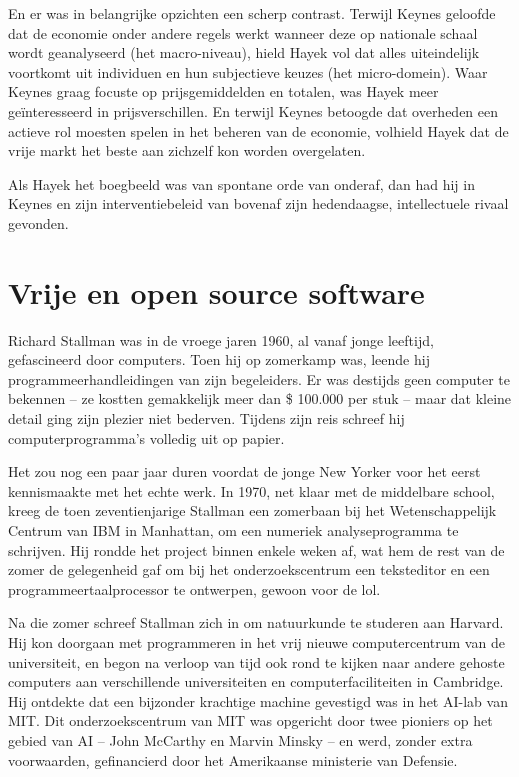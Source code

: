 \documentclass[
  a5paper,
  smalldemyvopaper,11pt,twoside,onecolumn,openright,extrafontsizes,
hidelinks]{memoir}
\begin{document}
En er was in belangrijke opzichten een scherp contrast. Terwijl Keynes
geloofde dat de economie onder andere regels werkt wanneer deze op
nationale schaal wordt geanalyseerd (het macro-niveau), hield Hayek vol
dat alles uiteindelijk voortkomt uit individuen en hun subjectieve
keuzes (het micro-domein). Waar Keynes graag focuste op prijsgemiddelden
en totalen, was Hayek meer geïnteresseerd in prijsverschillen. En
terwijl Keynes betoogde dat overheden een actieve rol moesten spelen in
het beheren van de economie, volhield Hayek dat de vrije markt het beste
aan zichzelf kon worden overgelaten.

Als Hayek het boegbeeld was van spontane orde van onderaf, dan had hij
in Keynes en zijn interventiebeleid van bovenaf zijn hedendaagse,
intellectuele rivaal gevonden.

\chapter{Vrije en open source
software}\label{vrije-en-open-source-software}

Richard Stallman was in de vroege jaren 1960, al vanaf jonge leeftijd,
gefascineerd door computers. Toen hij op zomerkamp was, leende hij
programmeerhandleidingen van zijn begeleiders. Er was destijds geen
computer te bekennen -- ze kostten gemakkelijk meer dan \$ 100.000 per
stuk -- maar dat kleine detail ging zijn plezier niet bederven. Tijdens
zijn reis schreef hij computerprogramma's volledig uit op papier.

Het zou nog een paar jaar duren voordat de jonge New Yorker voor het
eerst kennismaakte met het echte werk. In 1970, net klaar met de
middelbare school, kreeg de toen zeventienjarige Stallman een zomerbaan
bij het Wetenschappelijk Centrum van IBM in Manhattan, om een numeriek
analyseprogramma te schrijven. Hij rondde het project binnen enkele
weken af, wat hem de rest van de zomer de gelegenheid gaf om bij het
onderzoekscentrum een teksteditor en een programmeertaalprocessor te
ontwerpen, gewoon voor de lol.

Na die zomer schreef Stallman zich in om natuurkunde te studeren aan
Harvard. Hij kon doorgaan met programmeren in het vrij nieuwe
computercentrum van de universiteit, en begon na verloop van tijd ook
rond te kijken naar andere gehoste computers aan verschillende
universiteiten en computerfaciliteiten in Cambridge. Hij ontdekte dat
een bijzonder krachtige machine gevestigd was in het AI-lab van MIT. Dit
onderzoekscentrum van MIT was opgericht door twee pioniers op het gebied
van AI -- John McCarthy en Marvin Minsky -- en werd, zonder extra
voorwaarden, gefinancierd door het Amerikaanse ministerie van Defensie.
\end{document}
